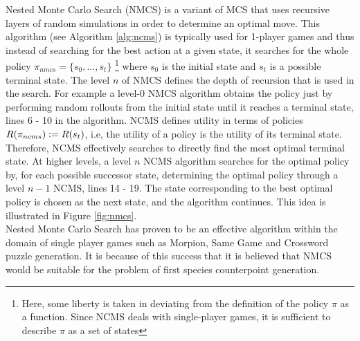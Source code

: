 \documentclass[master.tex]{subfiles}
\begin{document}
Nested Monte Carlo Search (NMCS) is a variant of MCS that uses recursive layers of random simulations in order to determine an optimal move. This algorithm (see Algorithm \ref{alg:ncms}) is typically used for 1-player games and thus instead of searching for the best action at a given state, it searches for the whole policy $\pi_{nmcs} = \{s_0, \dots, s_t \}$ \footnote{Here, some liberty is taken in deviating from the definition of the policy $\pi$ as a function. Since NCMS deals with single-player games, it is sufficient to describe $\pi$ as a set of states} where $s_0$ is the initial state and $s_t$ is a possible terminal state. The level $n$ of NMCS defines the depth of recursion that is used in the search. For example a level-0 NMCS algorithm obtains the policy just by performing random rollouts from the initial state until it reaches a terminal state, lines 6 - 10 in the algorithm. NCMS defines utility in terms of policies $R(\pi_{ncms}) \mathrel{\mathop:}= R(s_t)$, i.e, the utility of a policy is the utility of its terminal state. Therefore, NCMS effectively searches to directly find the most optimal terminal state. At higher levels, a level $n$ NCMS algorithm searches for the optimal policy by, for each possible successor state, determining the optimal policy through a level $n-1$ NCMS, lines 14 - 19. The state corresponding to the best optimal policy is chosen as the next state, and the algorithm continues. This idea is illustrated in Figure \ref{fig:nmcs}.
\\
Nested Monte Carlo Search has proven to be an effective algorithm within the domain of single player games such as Morpion, Same Game and Crossword puzzle generation. It is because of this success that it is believed that NMCS would be suitable for the problem of first species counterpoint generation.  
 
\end{document}
